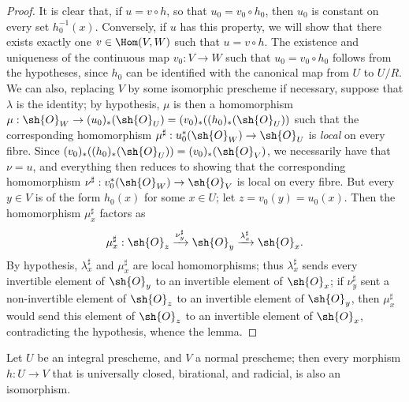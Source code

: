 \begin{proof}
\label{proof-II.8.11.1}
It is clear that, if $u=v\circ h$, so that $u_0=v_0\circ h_0$, then $u_0$ is constant on every set $h_0^{-1}(x)$.
Conversely, if $u$ has this property, we will show that there exists exactly one $v\in\Hom(V,W)$ such that $u=v\circ h$.
The existence and uniqueness of the continuous map $v_0:V\to W$ such that $u_0=v_0\circ h_0$ follows from the hypotheses, since $h_0$ can be identified with the canonical map from $U$ to $U/R$.
We can also, replacing $V$ by some isomorphic prescheme if necessary, suppose that $\lambda$ is the identity;
by hypothesis, $\mu$ is then a homomorphism $\mu:\sh{O}_W\to(u_0)_*(\sh{O}_U) = (v_0)_*((h_0)_*(\sh{O}_U))$ such that the corresponding homomorphism $\mu^\sharp:u_0^*(\sh{O}_W)\to\sh{O}_U$ is \emph{local} on every fibre.
Since $(v_0)_*((h_0)_*(\sh{O}_U))=(v_0)_*(\sh{O}_V)$, we necessarily have that $\nu=u$, and everything then reduces to showing that the corresponding homomorphism $\nu^\sharp:v_0^*(\sh{O}_W)\to\sh{O}_V$ is local on every fibre.
But every $y\in V$ is of the form $h_0(x)$ for some $x\in U$;
let $z=v_0(y)=u_0(x)$.
Then  the homomorphism $\mu_x^\sharp$ factors as
\[
    \mu_x^\sharp: \sh{O}_z \xrightarrow{\nu_y^\sharp} \sh{O}_y \xrightarrow{\lambda_x^\sharp} \sh{O}_x.
\]
By hypothesis, $\lambda_x^\sharp$ and $\mu_x^\sharp$ are local homomorphisms;
thus $\lambda_x^\sharp$ sends every invertible element of $\sh{O}_y$ to an invertible element of $\sh{O}_x$;
if $\nu_y^\sharp$ sent a non-invertible element of $\sh{O}_z$ to an invertible element of $\sh{O}_y$, then $\mu_x^\sharp$ would send this element of $\sh{O}_z$ to an invertible element of $\sh{O}_x$, contradicting the hypothesis, whence the lemma.
\end{proof}

\begin{corollary}[8.11.2]
\label{II.8.11.2}
Let $U$ be an integral prescheme, and $V$ a normal prescheme;
then every morphism $h:U\to V$ that is universally closed, birational, and radicial, is also an isomorphism.
\end{corollary}

